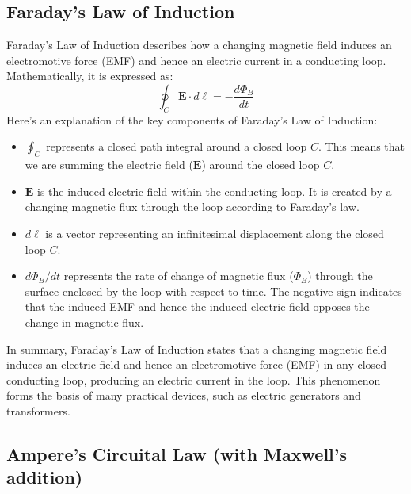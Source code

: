 \subsection{Faraday's Law of Induction}
Faraday's Law of Induction describes how a changing magnetic field induces an electromotive force (EMF) and hence an electric current in a conducting loop.
Mathematically, it is expressed as:
\[
\oint_C \mathbf{E} \cdot d\boldsymbol{\ell} = -\frac{d\Phi_B}{dt}
\]
Here's an explanation of the key components of Faraday's Law of Induction:
\begin{itemize}
  \item $\oint_C$ represents a closed path integral around a closed loop $C$. This means that we are summing the electric field ($\mathbf{E}$) around the closed loop $C$.
  
  \item $\mathbf{E}$ is the induced electric field within the conducting loop. It is created by a changing magnetic flux through the loop according to Faraday's law.
  
  \item $d\boldsymbol{\ell}$ is a vector representing an infinitesimal displacement along the closed loop $C$.
  
  \item $d\Phi_B/dt$ represents the rate of change of magnetic flux ($\Phi_B$) through the surface enclosed by the loop with respect to time. The negative sign indicates that the induced EMF and hence the induced electric field opposes the change in magnetic flux.
\end{itemize}

In summary, Faraday's Law of Induction states that a changing magnetic field induces an electric field and hence an electromotive force (EMF) in any closed conducting loop, producing an electric current in the loop. This phenomenon forms the basis of many practical devices, such as electric generators and transformers.


\subsection{Ampere's Circuital Law (with Maxwell's addition)}

